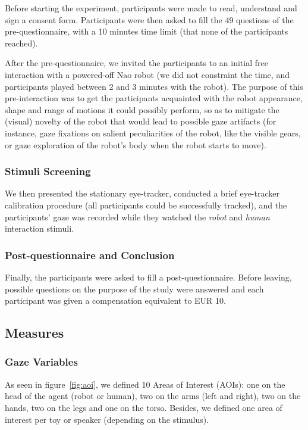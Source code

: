 \documentclass[lettersize, noapacite, twoside, HRI]{apa_HRI}
\begin{document}
Before starting the experiment, participants were made to read, understand and sign a
consent form. Participants were then asked to fill the 49 questions of
the pre-questionnaire, with a 10 minutes time limit (that none of the participants
reached).

After the pre-questionnaire, we invited the participants to an initial
free interaction with a powered-off Nao robot (we did not constraint
the time, and participants played between 2 and 3 minutes with the robot).
The purpose of this pre-interaction was to get the participants acquainted with the
robot appearance, shape and range of motions it could possibly perform, so as to
mitigate the (visual) novelty of the robot that would lead to possible
gaze artifacts (for instance, gaze fixations on salient peculiarities of the
robot, like the visible gears, or gaze exploration of the robot's body when the robot
starts to move).

\subsubsection{Stimuli Screening}

We then presented the stationary eye-tracker, conducted a brief eye-tracker
calibration procedure (all participants could be successfully tracked), and the participants' gaze was recorded while they
watched the \emph{robot} and \emph{human} interaction stimuli.

\subsubsection{Post-questionnaire and Conclusion}

Finally, the participants were asked to fill a post-questionnaire.
Before leaving, possible questions on the purpose of the study were
answered and each participant was given a compensation equivalent to EUR 10.

\subsection{Measures}

\subsubsection{Gaze Variables}

As seen in figure~\ref{fig:aoi}, we defined 10 Areas of Interest (AOIs): one on
the head of the agent (robot or human), two on the arms (left and right), two on
the hands, two on the legs and one on the torso. Besides, we defined one area of
interest per toy or speaker (depending on the stimulus).
\end{document}
